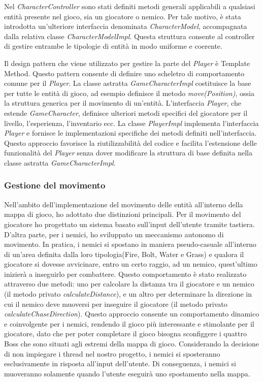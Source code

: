 \documentclass[a4paper,12pt]{report}
\begin{document}
Nel \textit{CharacterController} sono stati definiti metodi generali applicabili a qualsiasi entità presente nel gioco, sia un giocatore o nemico. Per tale motivo, è stata introdotta un'ulteriore interfaccia denominata \textit{CharacterModel}, accompagnata dalla relativa classe \textit{CharacterModelImpl}. Questa struttura consente al controller di gestire entrambe le tipologie di entità in modo uniforme e coerente.

Il design pattern che viene utilizzato per gestire la parte del \textit{Player} è Template Method. Questo pattern consente di definire uno scheletro di comportamento comune per il \textit{Player}. La classe astratta \textit{GameCharacterImpl} costituisce la base per tutte le entità di gioco, ad esempio definisce il metodo \textit{move(Position)}, ossia la struttura generica per il movimento di un'entità. L'interfaccia \textit{Player}, che estende \textit{GameCharacter}, definisce ulteriori metodi specifici del giocatore per il livello, l'esperienza, l'inventario ecc. La classe \textit{PlayerImpl} implementa l'interfaccia \textit{Player} e fornisce le implementazioni specifiche dei metodi definiti nell'interfaccia. Questo approccio favorisce la riutilizzabilità del codice e facilita l'estensione delle funzionalità del \textit{Player} senza dover modificare la struttura di base definita nella classe astratta \textit{GameCharacterImpl}.

\subsubsection{Gestione del movimento}
Nell'ambito dell'implementazione del movimento delle entità all'interno della mappa di gioco, ho adottato due distinzioni principali. Per il movimento del giocatore ho progettato un sistema basato sull'input dell'utente tramite tastiera. D'altra parte, per i nemici, ho sviluppato un meccanismo autonomo di movimento. In pratica, i nemici si spostano in maniera pseudo-casuale all'interno di un'area definita dalla loro tipologia(Fire, Bolt, Water e Grass) e qualora il giocatore si dovesse avvicinare, entro un certo raggio, ad un nemico, quest'ultimo inizierà a inseguirlo per combattere. Questo comportamento è stato realizzato attraverso due metodi: uno per calcolare la distanza tra il giocatore e un nemico (il metodo privato \textit{calculateDistance}), e un altro per determinare la direzione in cui il nemico deve muoversi per inseguire il giocatore (il metodo privato \textit{calculateChaseDirection}). Questo approccio consente un comportamento dinamico e coinvolgente per i nemici, rendendo il gioco più interessante e stimolante per il giocatore, dato che per poter completare il gioco bisogna sconfiggere i quattro Boss che sono situati agli estremi della mappa di gioco.
Considerando la decisione di non impiegare i thread nel nostro progetto, i nemici si sposteranno esclusivamente in risposta all'input dell'utente. Di conseguenza, i nemici si muoveranno solamente quando l'utente eseguirà uno spostamento nella mappa.
\end{document}
